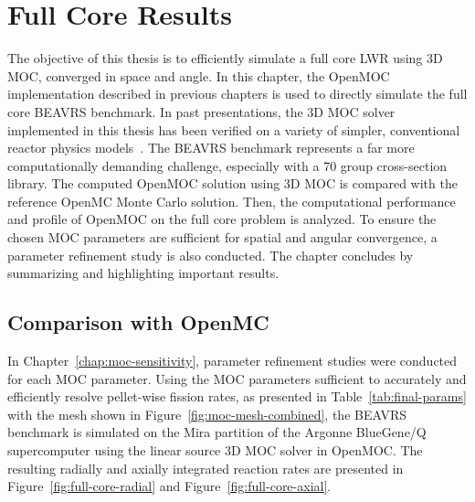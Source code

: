 \chapter{Full Core Results}
\label{chap:full-core-results}

The objective of this thesis is to efficiently simulate a full core \ac{LWR} using 3D \ac{MOC}, converged in space and angle. In this chapter, the OpenMOC implementation described in previous chapters is used to directly simulate the full core BEAVRS benchmark. In past presentations, the 3D \ac{MOC} solver implemented in this thesis has been verified on a variety of simpler, conventional reactor physics models~\cite{physor2016shaner, physor2016otf}. The BEAVRS benchmark represents a far more computationally demanding challenge, especially with a 70 group cross-section library. The computed OpenMOC solution using 3D \ac{MOC} is compared with the reference OpenMC Monte Carlo solution. Then, the computational performance and profile of OpenMOC on the full core problem is analyzed. To ensure the chosen \ac{MOC} parameters are sufficient for spatial and angular convergence, a parameter refinement study is also conducted. The chapter concludes by summarizing and highlighting important results.

\section{Comparison with OpenMC}
\label{sec:openmc-compare}

In Chapter~\ref{chap:moc-sensitivity}, parameter refinement studies were conducted for each \ac{MOC} parameter. Using the \ac{MOC} parameters sufficient to accurately and efficiently resolve pellet-wise fission rates, as presented in Table~\ref{tab:final-params} with the mesh shown in Figure~\ref{fig:moc-mesh-combined}, the BEAVRS benchmark is simulated on the Mira partition of the Argonne BlueGene/Q supercomputer using the linear source 3D \ac{MOC} solver in OpenMOC. The resulting radially and axially integrated reaction rates are presented in Figure~\ref{fig:full-core-radial} and Figure~\ref{fig:full-core-axial}.


